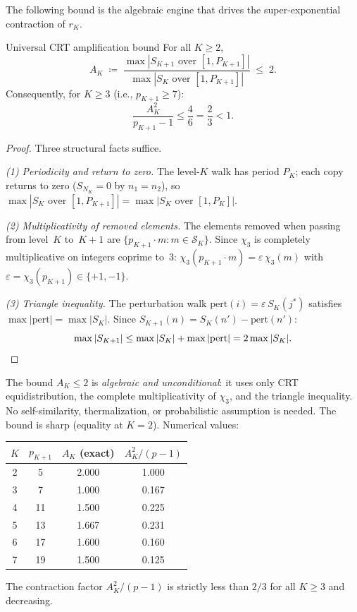\documentclass[12pt,a4paper]{article}
\begin{document}
The following bound is the algebraic engine that drives the
super-exponential contraction of $r_K$.

\begin{thmbox}{Universal CRT amplification bound}
\label{thm:crt_amplification}
For all $K \geq 2$,
\begin{equation}
  A_K \;\coloneqq\;
  \frac{\max|S_{K+1} \text{ over } [1,P_{K+1}]|}
       {\max|S_K \text{ over } [1,P_{K+1}]|}
  \;\leq\; 2.
  \label{eq:AK_bound}
\end{equation}
Consequently, for $K \geq 3$ (i.e., $p_{K+1} \geq 7$):
\begin{equation}
  \frac{A_K^2}{p_{K+1}-1} \leq \frac{4}{6} = \frac{2}{3} < 1.
  \label{eq:AK_contraction}
\end{equation}

\begin{proof}
Three structural facts suffice.

\emph{(1) Periodicity and return to zero.}
The level-$K$ walk has period $P_K$; each copy returns to zero
($S_{N_K} = 0$ by $n_1 = n_2$), so
$\max|S_K \text{ over } [1,P_{K+1}]| = \max|S_K \text{ over } [1,P_K]|$.

\emph{(2) Multiplicativity of removed elements.}
The elements removed when passing from level~$K$ to~$K{+}1$ are
$\{p_{K+1}\cdot m : m \in \mathcal{S}_K\}$.
Since $\chi_3$ is completely multiplicative on integers coprime to~$3$:
$\chi_3(p_{K+1}\cdot m) = \varepsilon\,\chi_3(m)$ with
$\varepsilon = \chi_3(p_{K+1}) \in \{+1,-1\}$.

\emph{(3) Triangle inequality.}
The perturbation walk $\mathrm{pert}(i)
= \varepsilon\,S_K(j^*)$ satisfies
$\max|\mathrm{pert}| = \max|S_K|$.
Since $S_{K+1}(n) = S_K(n') - \mathrm{pert}(n')$:
\[
  \max|S_{K+1}| \leq \max|S_K| + \max|\mathrm{pert}| = 2\max|S_K|.
  \qedhere
\]
\end{proof}
\end{thmbox}

\begin{remark}
The bound $A_K \leq 2$ is \emph{algebraic and unconditional}: it uses
only CRT equidistribution, the complete multiplicativity of $\chi_3$,
and the triangle inequality. No self-similarity, thermalization, or
probabilistic assumption is needed. The bound is sharp (equality at
$K=2$). Numerical values:
\begin{center}
\begin{tabular}{cccc}
\toprule
$K$ & $p_{K+1}$ & $A_K$ (exact) & $A_K^2/(p-1)$ \\
\midrule
2 & 5 & 2.000 & 1.000 \\
3 & 7 & 1.000 & 0.167 \\
4 & 11 & 1.500 & 0.225 \\
5 & 13 & 1.667 & 0.231 \\
6 & 17 & 1.600 & 0.160 \\
7 & 19 & 1.500 & 0.125 \\
\bottomrule
\end{tabular}
\end{center}
The contraction factor $A_K^2/(p-1)$ is strictly less than $2/3$
for all $K \geq 3$ and decreasing.
\end{remark}
\end{document}
